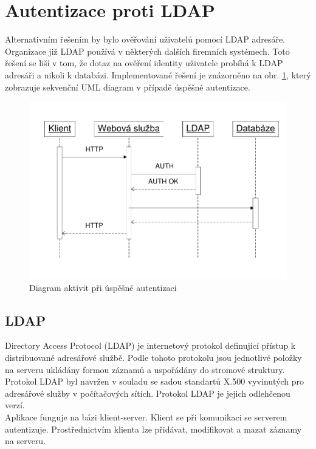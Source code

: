\documentclass{diplomka}
\begin{document}
\section{Autentizace proti LDAP}
Alternativním řešením by bylo ověřování uživatelů pomocí LDAP adresáře. Organizace již LDAP používá v některých dalších firemních systémech. Toto řešení se liší v tom, že dotaz na ověření identity uživatele probíhá k LDAP adresáři a nikoli k databázi. Implementované řešení je znázorněno na obr. \ref{fig:authldap}, který zobrazuje sekvenční UML diagram v případě úspěšné autentizace.
\begin{figure}[H]
  \centering
  \includegraphics[scale=0.8]{visio/auth_ldap.pdf}
\caption{Diagram aktivit při úspěšné autentizaci}
\label{fig:authldap}
\end{figure}
\vspace{-6mm}
\subsection{LDAP}
 Directory Access Protocol (LDAP) je internetový protokol definující přístup k distribuované adresářové službě. Podle tohoto protokolu jsou jednotlivé položky na serveru ukládány formou záznamů a uspořádány do stromové struktury. Protokol LDAP byl navržen v souladu  se sadou standartů X.500 vyvinutých pro adresářové služby v počítačových sítích. Protokol LDAP je jejich odlehčenou verzí.\\ \indent
Aplikace funguje na bázi klient-server. Klient se při komunikaci se serverem autentizuje. Prostřednictvím klienta lze přidávat, modifikovat a mazat záznamy na serveru.
\end{document}
